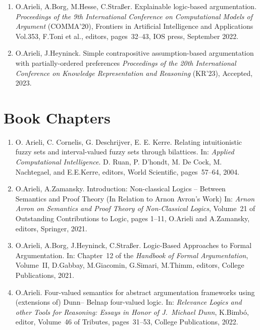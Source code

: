 \documentclass{article}
\begin{document}
\begin{enumerate}
  \item O.Arieli, A.Borg, M.Hesse, C.Stra{\ss}er.
           Explainable logic-based argumentation.
           {\em Proceedings of the 9th International Conference on Computational Models of Argument\/} (COMMA'20),
           Frontiers in Artificial Intelligence and Applications Vol.353, F.Toni et al., editors, pages~32--43, IOS press, September 2022.

  \item O.Arieli, J.Heyninck.
           Simple contrapositive assumption-based argumentation with partially-ordered preferences
           {\em Proceedings of the 20th International Conference on Knowledge Representation and Reasoning\/} (KR'23),
           Accepted, 2023.

\end{enumerate}


\section*{Book Chapters}

\begin{enumerate}

 \item O. Arieli, C. Cornelis, G. Deschrijver, E. E. Kerre.        
          Relating intuitionistic fuzzy sets and interval-valued fuzzy sets through bilattices. In: {\em Applied Computational Intelligence\/}.
          D. Ruan, P. D'hondt, M. De Cock, M. Nachtegael, and E.E.Kerre, editors, World Scientific, pages~57--64, 2004.

  \item O.Arieli, A.Zamansky.
          Introduction: Non-classical Logics -- Between Semantics and Proof Theory (In Relation to Arnon Avron's Work)
          In: {\em Arnon Avron on Semantics and Proof Theory of Non-Classical Logics\/}, Volume~21 of Outstanding
          Contributions to Logic, pages 1--11, O.Arieli and A.Zamansky, editors, Springer, 2021.

  \item O.Arieli, A.Borg, J.Heyninck, C.Stra{\ss}er.
           Logic-Based Approaches to Formal Argumentation. In: Chapter~12 of the {\em Handbook of Formal Argumentation\/},
           Volume~II, D.Gabbay, M.Giacomin, G.Simari, M.Thimm, editors, College Publications, 2021.
           
  \item O.Arieli.
           Four-valued semantics for abstract argumentation frameworks using (extensions of) Dunn--{\allowbreak}
           Belnap four-valued logic. In: {\em Relevance Logics and other Tools for Reasoning: Essays in Honor of
           J.~Michael Dunn\/}, K.Bimb\'o, editor, Volume~46 of Tributes, pages~31--53, College Publications, 2022.         

\end{enumerate}
\end{document}
